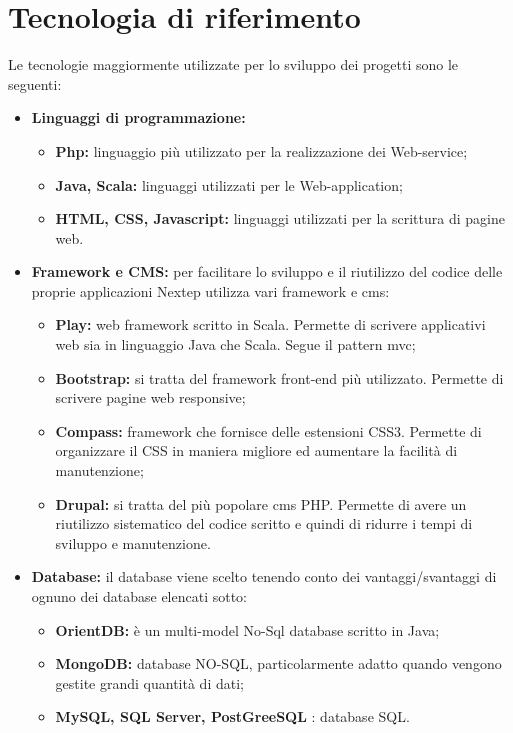 \section{Tecnologia di riferimento}
Le tecnologie maggiormente utilizzate per lo sviluppo dei progetti sono le seguenti:
\begin{itemize}
	\item \textbf{Linguaggi di programmazione: }
	\begin{itemize}
		\item \textbf{Php: }linguaggio più utilizzato per la realizzazione dei Web-service;
		\item \textbf{Java, Scala: }linguaggi utilizzati per le Web-application;
		\item \textbf{HTML, CSS, Javascript: }linguaggi utilizzati per la scrittura di pagine web.
	\end{itemize}
	\item \textbf{Framework e CMS: }per facilitare lo sviluppo e il riutilizzo del codice delle proprie applicazioni Nextep utilizza vari \gls{framework} e \gls{cms}:
	\begin{itemize}
		\item \textbf{Play: }web \gls{framework} scritto in Scala. Permette di scrivere applicativi web sia in linguaggio Java che Scala. Segue il pattern \gls{mvc};
		\item \textbf{Bootstrap: }si tratta del \gls{framework} front-end più utilizzato. Permette di scrivere pagine web responsive;
		\item \textbf{Compass: }\gls{framework} che fornisce delle estensioni CSS3. Permette di organizzare il CSS in maniera migliore ed aumentare la facilità di manutenzione;
		\item \textbf{Drupal: }si tratta del più popolare \gls{cms} PHP. Permette di avere un riutilizzo sistematico del codice scritto e quindi di ridurre i tempi di sviluppo e manutenzione.
	\end{itemize}
	\item \textbf{Database: }il database viene scelto tenendo conto dei vantaggi/svantaggi di ognuno dei database elencati sotto:
	\begin{itemize}
		\item \textbf{OrientDB: }è un multi-model No-Sql database scritto in Java;
		\item \textbf{MongoDB: }database NO-SQL, particolarmente adatto quando vengono gestite grandi quantità di dati;
		\item \textbf{MySQL, SQL Server, PostGreeSQL }: database SQL.
	\end{itemize}
\end{itemize}
